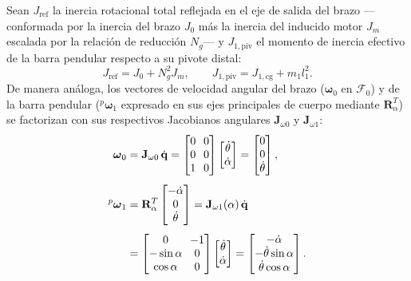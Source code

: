 Sean $J_{\text{ref}}$ la inercia rotacional total reflejada en el eje de salida del brazo ---conformada por la inercia del brazo $J_0$ más la inercia del inducido motor $J_m$ escalada por la relación de reducción $N_g$--- y $J_{1,\text{piv}}$ el momento de inercia efectivo de la barra pendular respecto a su pivote distal:
\begin{equation}
    J_{\text{ref}} = J_0 + N_g^2 J_m, \qquad
    J_{1,\text{piv}} = J_{1,\text{cg}} + m_1 l_1^2.
    \label{eq:inercias_equiv}
\end{equation}
De manera análoga, los vectores de velocidad angular del brazo ($\boldsymbol{\omega}_0$ en $\mathcal{F}_0$) y de la barra pendular (${}^{p}\boldsymbol{\omega}_1$ expresado en sus ejes principales de cuerpo mediante $\mathbf{R}_\alpha^T$) se factorizan con sus respectivos Jacobianos angulares $\mathbf{J}_{\omega 0}$ y $\mathbf{J}_{\omega 1}$:
\begin{equation}
    \setlength{\arraycolsep}{3.5pt}
    \begin{aligned}
        \boldsymbol{\omega}_0 &= \mathbf{J}_{\omega 0}\,\dot{\mathbf{q}}
        = \begin{bmatrix} 0 & 0 \\ 0 & 0 \\ 1 & 0 \end{bmatrix}
        \begin{bmatrix} \dot{\theta} \\ \dot{\alpha} \end{bmatrix}
        = \begin{bmatrix} 0 \\ 0 \\ \dot{\theta} \end{bmatrix}, \\[4pt]
        {}^{p}\boldsymbol{\omega}_1 &= \mathbf{R}_\alpha^T
        \begin{bmatrix} -\dot{\alpha} \\ 0 \\ \dot{\theta} \end{bmatrix}
        = \mathbf{J}_{\omega 1}(\alpha)\,\dot{\mathbf{q}} \\[3pt]
        &= \begin{bmatrix}
            0 & -1 \\
            -\sin\alpha & 0 \\
            \cos\alpha & 0
        \end{bmatrix}
        \begin{bmatrix} \dot{\theta} \\ \dot{\alpha} \end{bmatrix}
        = \begin{bmatrix}
            -\dot{\alpha} \\
            -\dot{\theta}\sin\alpha \\
            \dot{\theta}\cos\alpha
        \end{bmatrix}.
    \end{aligned}
    \label{eq:vel_ang_mat}
\end{equation}
